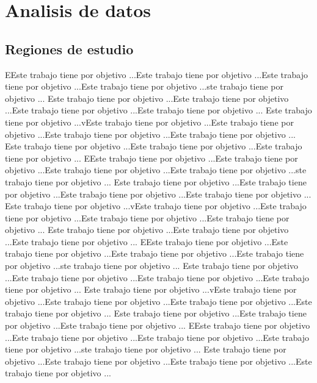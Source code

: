 \chapter{Analisis de datos}
\section{Regiones de estudio} 
EEste trabajo tiene por objetivo ...Este trabajo tiene por objetivo ...Este trabajo tiene por objetivo ...Este trabajo tiene por objetivo ...ste trabajo tiene por objetivo ...
Este trabajo tiene por objetivo ...Este trabajo tiene por objetivo ...Este trabajo tiene por objetivo ...Este trabajo tiene por objetivo ...
Este trabajo tiene por objetivo ...vEste trabajo tiene por objetivo ...Este trabajo tiene por objetivo ...Este trabajo tiene por objetivo ...Este trabajo tiene por objetivo ...
Este trabajo tiene por objetivo ...Este trabajo tiene por objetivo ...Este trabajo tiene por objetivo ...
EEste trabajo tiene por objetivo ...Este trabajo tiene por objetivo ...Este trabajo tiene por objetivo ...Este trabajo tiene por objetivo ...ste trabajo tiene por objetivo ...
Este trabajo tiene por objetivo ...Este trabajo tiene por objetivo ...Este trabajo tiene por objetivo ...Este trabajo tiene por objetivo ...
Este trabajo tiene por objetivo ...vEste trabajo tiene por objetivo ...Este trabajo tiene por objetivo ...Este trabajo tiene por objetivo ...Este trabajo tiene por objetivo ...
Este trabajo tiene por objetivo ...Este trabajo tiene por objetivo ...Este trabajo tiene por objetivo ...
EEste trabajo tiene por objetivo ...Este trabajo tiene por objetivo ...Este trabajo tiene por objetivo ...Este trabajo tiene por objetivo ...ste trabajo tiene por objetivo ...
Este trabajo tiene por objetivo ...Este trabajo tiene por objetivo ...Este trabajo tiene por objetivo ...Este trabajo tiene por objetivo ...
Este trabajo tiene por objetivo ...vEste trabajo tiene por objetivo ...Este trabajo tiene por objetivo ...Este trabajo tiene por objetivo ...Este trabajo tiene por objetivo ...
Este trabajo tiene por objetivo ...Este trabajo tiene por objetivo ...Este trabajo tiene por objetivo ...
EEste trabajo tiene por objetivo ...Este trabajo tiene por objetivo ...Este trabajo tiene por objetivo ...Este trabajo tiene por objetivo ...ste trabajo tiene por objetivo ...
Este trabajo tiene por objetivo ...Este trabajo tiene por objetivo ...Este trabajo tiene por objetivo ...Este trabajo tiene por objetivo ...

